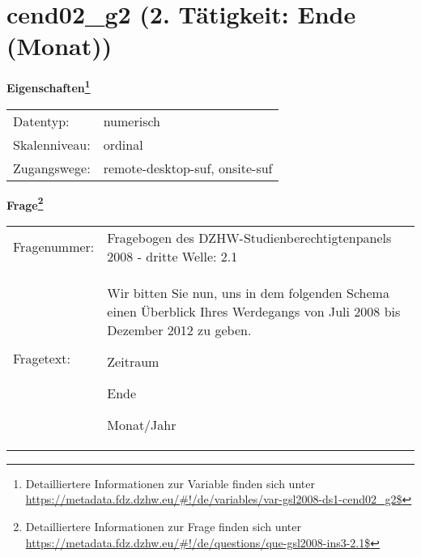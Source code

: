 
    \setcounter{footnote}{0}

    \vspace*{-1.8cm}
	\section{cend02\_g2 (2. Tätigkeit: Ende (Monat))}
	\label{section:cend02_g2}



    \vspace*{0.5cm}
    \noindent\textbf{Eigenschaften\footnote{Detailliertere Informationen zur Variable finden sich unter
		\url{https://metadata.fdz.dzhw.eu/\#!/de/variables/var-gsl2008-ds1-cend02_g2$}}}\\
	\begin{tabularx}{\hsize}{@{}lX}
	Datentyp: & numerisch \\
	Skalenniveau: & ordinal \\
	Zugangswege: &
	  remote-desktop-suf, 
	  onsite-suf
 \\
    \end{tabularx}



				\vspace*{0.5cm}
                \noindent\textbf{Frage\footnote{Detailliertere Informationen zur Frage finden sich unter
		              \url{https://metadata.fdz.dzhw.eu/\#!/de/questions/que-gsl2008-ins3-2.1$}}}\\
				\begin{tabularx}{\hsize}{@{}lX}
					Fragenummer: &
					  Fragebogen des DZHW-Studienberechtigtenpanels 2008 - dritte Welle:
					  2.1
 \\
					Fragetext: & Wir bitten Sie nun, uns in dem folgenden Schema einen Überblick Ihres Werdegangs von Juli 2008 bis Dezember 2012 zu geben.\par  Zeitraum\par  Ende\par  Monat/Jahr \\
				\end{tabularx}





